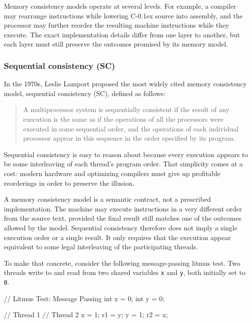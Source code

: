 \documentclass[fontsize=10pt, oneside]{scrartcl}
\newcommand{\monobox}[1]{\mbox{\texttt{#1}}}
\newcommand{\cplusplus}[1]{C\kern-0.1ex\raisebox{0.15ex}{\texttt{++}}}
\begin{document}
Memory consistency models operate at several levels.
For example, a compiler may rearrange instructions while lowering \cplusplus{} source into assembly, and the processor may further reorder the resulting machine instructions while they execute.
The exact implementation details differ from one layer to another, but each layer must still preserve the outcomes promised by its memory model.

\subsubsection{Sequential consistency (SC)}

In the 1970s, Leslie Lamport proposed the most widely cited memory consistency model, sequential consistency (SC), defined as follows:

\begin{quote}
A multiprocessor system is sequentially consistent if the result of any execution is the same as if the operations of all the processors were executed in some sequential order, and the operations of each individual processor appear in this sequence in the order specified by its program.
\end{quote}

Sequential consistency is easy to reason about because every execution appears to be some interleaving of each thread's program order.
That simplicity comes at a cost: modern hardware and optimizing compilers must give up profitable reorderings in order to preserve the illusion.

A memory consistency model is a semantic contract, not a prescribed implementation.
The machine may execute instructions in a very different order from the source text, provided the final result still matches one of the outcomes allowed by the model.
Sequential consistency therefore does not imply a single execution order or a single result.
It only requires that the execution appear equivalent to some legal interleaving of the participating threads.

To make that concrete, consider the following message-passing litmus test.
Two threads write to and read from two shared variables \monobox{x} and \monobox{y}, both initially set to \monobox{0}.

\begin{ccode}
// Litmus Test: Message Passing
int x = 0;
int y = 0;

// Thread 1        // Thread 2
x = 1;             r1 = y;
y = 1;             r2 = x;
\end{ccode}
\end{document}

